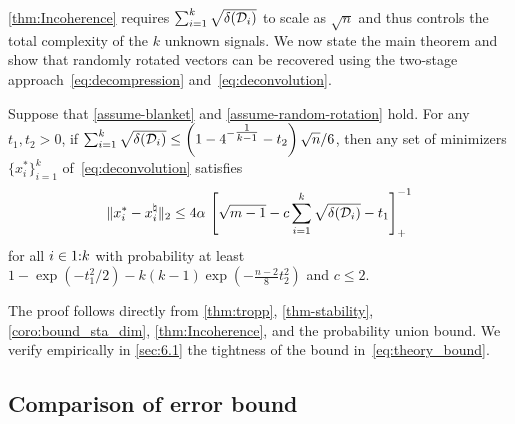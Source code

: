 \autoref{thm:Incoherence} requires $\sum_{i=1}^k \sqrt{\delta(\mathcal{D}_i)}$ to scale as $\sqrt{n}$ and thus controls the total complexity of the $k$ unknown signals. We now state the main theorem and show that randomly rotated vectors can be recovered using the two-stage approach~\eqref{eq:decompression} and~\eqref{eq:deconvolution}.

\begin{theorem} \label{corollary-stability}
    Suppose that \autoref{assume-blanket} and \autoref{assume-random-rotation} hold. For any $t_1, t_2 > 0$, if $\sum_{i=1}^k \sqrt{\delta(\mathcal{D}_i)} \leq \left(1 - 4^{- \tfrac{1}{k-1} } - t_2\right)\sqrt{n} / 6$, then any set of minimizers $\{x_i^*\}_{i=1}^k$ of~\eqref{eq:deconvolution} satisfies 
  \begin{equation} \label{eq:theory_bound}
    \|x_i^* - x_i^{\natural}\|_2 
     \leq
     4\alpha\,\left[\sqrt{m-1} - c\sum_{i=1}^k \sqrt{\delta(\mathcal{D}_i)} - t_1\right]_+^{-1}
  \end{equation}
   for all $i\in1\mathord{:}k$ with probability at least $1 - \exp\left(-t_1^2/2\right) - k(k-1)\exp(-\tfrac{n-2}{8}t_2^2)$ and $c\leq2$.
\end{theorem}
The proof follows directly from \autoref{thm:tropp}, \autoref{thm-stability}, \autoref{coro:bound_sta_dim}, \autoref{thm:Incoherence}, and the probability union bound. We verify empirically in \autoref{sec:6.1} the tightness of the bound in~\eqref{eq:theory_bound}.

\subsection{Comparison of error bound} \label{sec:comparasion}

